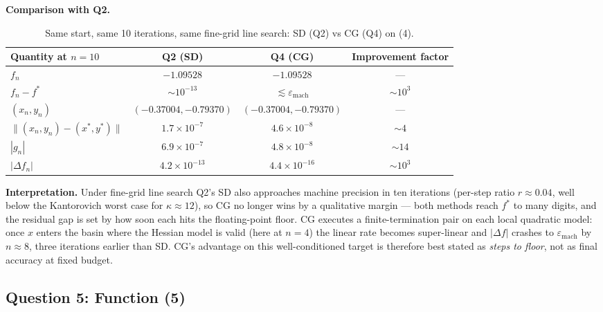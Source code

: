 \documentclass[11pt,a4paper]{article}
\begin{document}
\textbf{Comparison with Q2.}

\begin{table}[htbp]
\centering
\caption{Same start, same 10 iterations, same fine-grid line search: SD (Q2) vs CG (Q4) on (4).}
\label{tab:q4-vs-q2}
\begin{tabular}{lccc}
\toprule
Quantity at \(n=10\) & Q2 (SD) & Q4 (CG) & Improvement factor\\
\midrule
\(f_{n}\)                                 & \(-1.09528\)            & \(-1.09528\)            & ---\\
\(f_{n}-f^{*}\)                           & \(\sim 10^{-13}\)       & \(\lesssim\varepsilon_{\text{mach}}\)   & \(\sim 10^{3}\)\\
\((x_{n},y_{n})\)                         & \((-0.37004,-0.79370)\) & \((-0.37004,-0.79370)\) & ---\\
\(\|(x_{n},y_{n})-(x^{*},y^{*})\|\)       & \(1.7\times 10^{-7}\)   & \(4.6\times 10^{-8}\)   & \(\sim 4\)\\
\(|g_{n}|\)                               & \(6.9\times 10^{-7}\)   & \(4.8\times 10^{-8}\)   & \(\sim 14\)\\
\(|\Delta f_{n}|\)                        & \(4.2\times 10^{-13}\)  & \(4.4\times 10^{-16}\)  & \(\sim 10^{3}\)\\
\bottomrule
\end{tabular}
\end{table}

\textbf{Interpretation.}
Under fine-grid line search Q2's SD also approaches machine precision in ten iterations (per-step ratio \(r\approx 0.04\), well below the Kantorovich worst case for \(\kappa\approx 12\)), so CG no longer wins by a qualitative margin --- both methods reach \(f^{*}\) to many digits, and the residual gap is set by how soon each hits the floating-point floor. CG executes a finite-termination pair on each local quadratic model: once \(x\) enters the basin where the Hessian model is valid (here at \(n=4\)) the linear rate becomes super-linear and \(|\Delta f|\) crashes to \(\varepsilon_{\text{mach}}\) by \(n\approx 8\), three iterations earlier than SD. CG's advantage on this well-conditioned target is therefore best stated as \emph{steps to floor}, not as final accuracy at fixed budget.

\subsection*{Question 5: Function (5)}
\end{document}
